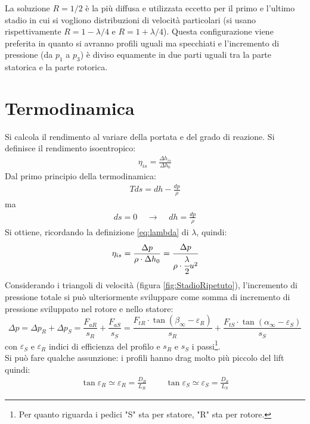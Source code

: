 La soluzione $R = 1/2$ è la più diffusa e utilizzata eccetto per il primo e l'ultimo stadio in cui si vogliono distribuzioni di velocità particolari (si usano rispettivamente $R = 1 - \lambda /4$ e $R = 1 + \lambda /4$). Questa configurazione viene preferita in quanto si avranno profili uguali ma specchiati e l'incremento di pressione (da $p_1$ a $p_3$) è diviso equamente in due parti uguali tra la parte statorica e la parte rotorica. 

\section{Termodinamica}
Si calcola il rendimento al variare della portata e del grado di reazione. Si definisce il rendimento isoentropico:
\begin{align*}
\eta_{is} = \frac{\Delta h_{is}}{\Delta h_0}
\end{align*}
Dal primo principio della termodinamica:
\begin{align*}
T ds = dh - \frac{dp}{\rho}
\end{align*}
ma
\begin{align*}
ds = 0 \;\;\;\; \rightarrow \;\;\;\; dh = \frac{dp}{\rho}
\end{align*}
Si ottiene, ricordando la definizione \ref{eq:lambda} di $\lambda$, quindi:
\begin{equation}\label{eq:etadp}
\eta_{is} = \frac{\Delta p}{\rho \cdot \Delta h_0} = \cfrac{\Delta p}{\rho \cdot \cfrac{\lambda}{2} u^2}
\end{equation}
Considerando i triangoli di velocità (figura \ref{fig:StadioRipetuto}), l'incremento di pressione totale si può ulteriormente sviluppare come somma di incremento di pressione sviluppato nel rotore e nello statore:
\begin{equation}
\Delta p = \Delta p_R + \Delta p_S = \frac{F_{aR}}{s_R} + \frac{F_{aS}}{s_S} = \frac{F_{tR} \cdot \tan(\beta_{\infty} - \varepsilon_R)}{s_R} + \frac{F_{tS} \cdot \tan(\alpha_{\infty} - \varepsilon_S)}{s_S}
\label{eq:deltap}
\end{equation}
con $\varepsilon_S$ e $\varepsilon_R$ indici di efficienza del profilo e $s_R$ e $s_S$ i passi\footnote{Per quanto riguarda i pedici "S" sta per statore, "R" sta per rotore.}.\\
Si può fare qualche assunzione: i profili hanno drag molto più piccolo del lift quindi:
\begin{align*}
\tan \varepsilon_R \simeq \varepsilon_R = \frac{D_R}{L_R} \;\;\;\;\;\;\;\; \tan \varepsilon_S \simeq \varepsilon_S = \frac{D_S}{L_S}
\end{align*}
